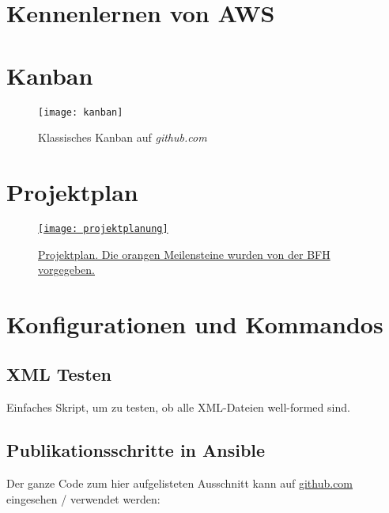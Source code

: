 \section{Kennenlernen von AWS}
\section{Kanban}\label{appendix:kanban}
\begin{figure}[H]
	\centering
	\texttt{[image: kanban]}
	\caption{Klassisches Kanban auf \emph{github.com}}
	\label{fig:Klassisches Kanban}
\end{figure}

\section{Projektplan}\label{appendix:projektplan}
\begin{figure}[H]
	\centering
	\href{https://docs.google.com/spreadsheets/d/1zKTZgt4BW736G0xRfU9o3vWYwAJj-8nzFvGsPR7yJ_0/edit?usp=sharing}{
	\texttt{[image: projektplanung]}}
	\caption{\href{https://docs.google.com/spreadsheets/d/1zKTZgt4BW736G0xRfU9o3vWYwAJj-8nzFvGsPR7yJ_0/edit?usp=sharing}{Projektplan. Die orangen Meilensteine wurden von der BFH vorgegeben.}}
	\label{fig:Projektplan}
\end{figure}

\section{Konfigurationen und Kommandos}
\subsection{XML Testen}
Einfaches Skript, um zu testen, ob alle XML-Dateien well-formed sind.

\subsection{Publikationsschritte in Ansible}
Der ganze Code zum hier aufgelisteten Ausschnitt kann auf \href{https://github.com/bfh-semesterarbeit/spot-geoprocessing}{github.com} eingesehen / verwendet werden:


